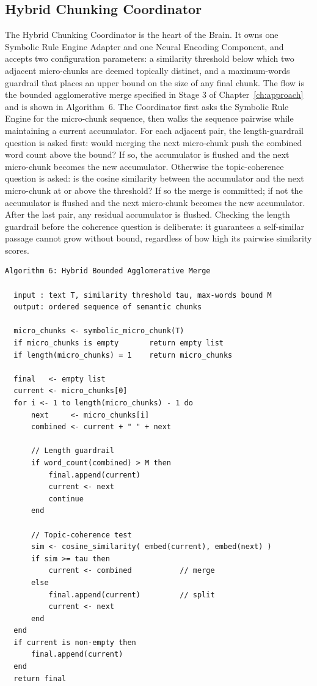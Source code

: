 \documentclass[12pt,a4paper,oneside]{report}
\begin{document}
\subsection{Hybrid Chunking Coordinator}
\label{sec:impl-hybrid}
The Hybrid Chunking Coordinator is the heart of the Brain. It owns one Symbolic Rule Engine Adapter and one Neural Encoding Component, and accepts two configuration parameters: a similarity threshold below which two adjacent micro-chunks are deemed topically distinct, and a maximum-words guardrail that places an upper bound on the size of any final chunk. The flow is the bounded agglomerative merge specified in Stage 3 of Chapter~\ref{ch:approach} and is shown in Algorithm~6. The Coordinator first asks the Symbolic Rule Engine for the micro-chunk sequence, then walks the sequence pairwise while maintaining a current accumulator. For each adjacent pair, the length-guardrail question is asked first: would merging the next micro-chunk push the combined word count above the bound? If so, the accumulator is flushed and the next micro-chunk becomes the new accumulator. Otherwise the topic-coherence question is asked: is the cosine similarity between the accumulator and the next micro-chunk at or above the threshold? If so the merge is committed; if not the accumulator is flushed and the next micro-chunk becomes the new accumulator. After the last pair, any residual accumulator is flushed. Checking the length guardrail before the coherence question is deliberate: it guarantees a self-similar passage cannot grow without bound, regardless of how high its pairwise similarity scores.

\begin{verbatim}
Algorithm 6: Hybrid Bounded Agglomerative Merge

  input : text T, similarity threshold tau, max-words bound M
  output: ordered sequence of semantic chunks

  micro_chunks <- symbolic_micro_chunk(T)
  if micro_chunks is empty       return empty list
  if length(micro_chunks) = 1    return micro_chunks

  final   <- empty list
  current <- micro_chunks[0]
  for i <- 1 to length(micro_chunks) - 1 do
      next     <- micro_chunks[i]
      combined <- current + " " + next

      // Length guardrail
      if word_count(combined) > M then
          final.append(current)
          current <- next
          continue
      end

      // Topic-coherence test
      sim <- cosine_similarity( embed(current), embed(next) )
      if sim >= tau then
          current <- combined           // merge
      else
          final.append(current)         // split
          current <- next
      end
  end
  if current is non-empty then
      final.append(current)
  end
  return final
\end{verbatim}
\end{document}
